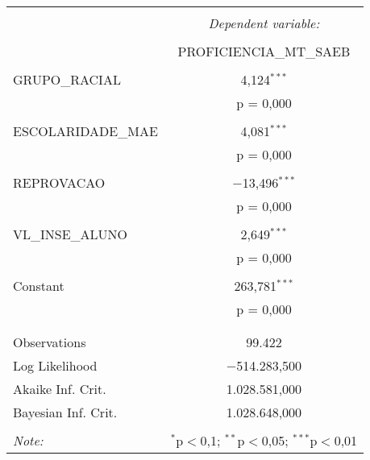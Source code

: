 \begin{table}[!htbp] \centering 
  \caption{} 
  \label{} 
\begin{tabular}{@{\extracolsep{5pt}}lc} 
\\[-1.8ex]\hline 
\hline \\[-1.8ex] 
 & \multicolumn{1}{c}{\textit{Dependent variable:}} \\ 
\cline{2-2} 
\\[-1.8ex] & PROFICIENCIA\_MT\_SAEB \\ 
\hline \\[-1.8ex] 
 GRUPO\_RACIAL & 4,124$^{***}$ \\ 
  & p = 0,000 \\ 
  & \\ 
 ESCOLARIDADE\_MAE & 4,081$^{***}$ \\ 
  & p = 0,000 \\ 
  & \\ 
 REPROVACAO & $-$13,496$^{***}$ \\ 
  & p = 0,000 \\ 
  & \\ 
 VL\_INSE\_ALUNO & 2,649$^{***}$ \\ 
  & p = 0,000 \\ 
  & \\ 
 Constant & 263,781$^{***}$ \\ 
  & p = 0,000 \\ 
  & \\ 
\hline \\[-1.8ex] 
Observations & 99.422 \\ 
Log Likelihood & $-$514.283,500 \\ 
Akaike Inf. Crit. & 1.028.581,000 \\ 
Bayesian Inf. Crit. & 1.028.648,000 \\ 
\hline 
\hline \\[-1.8ex] 
\textit{Note:}  & \multicolumn{1}{r}{$^{*}$p$<$0,1; $^{**}$p$<$0,05; $^{***}$p$<$0,01} \\ 
\end{tabular} 
\end{table} 

